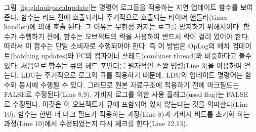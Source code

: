 그림 \ref{fig:glduphysicalupdate}는 명령어 로그들을 적용하는 지연 업데이트 함수를 보여준다. 
 함수는 리드 전에 호출되거나 주기적으로 호출되는 타이머 핸들러(timer handler)에 의해
호출 된다. 
그 이유는 무한정 커지는 로그를 방지하기 위해서이다.
 함수가 수행하기 전에,  함수는 오브젝트의 락을 사용하여
반드시 락이 걸려 있어야 한다.
따라서 이 함수는 단일 소비자로 수행되어야 한다. 즉 이 방법은 OpLog의 배치
 업데이트(batching updates)와 FC의 컴파이너 쓰레드(combiner thread)와 비슷하다고 볼수 있다. 
처음으로  함수는 큐의 헤드 포인터를 원자적인 스왑 명령(Line 3)을 이용하여 
얻는다.
LDU는 주기적으로 로그의 큐를 적용하기 때문에, LDU의 업데이트 명령어는  함수와 
동시에 수행될 수 있다. 
그러므로 원본 자료구조에 적용하기 전에 마크필드는 FALSE로 수정된다(Line 8,9).
가비지 로그를 위한 사용 플래그(used flag)는 FALSE로 수정된다. 이것은 이 오브젝트가 큐에 포함되어 있지 
않는다는 것을 의미한다(Line 10).
 함수는 한번 더 마크 필드가 적용하는 과정(Line 8)과 가비지 비트를 초기화 하는 과정(Line
10)에서 수정되었는지 다시 체크를 한다(Line 12,13).

